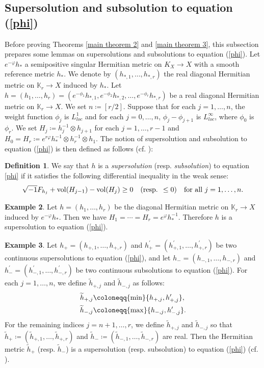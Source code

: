 \documentclass[12pt]{article}
\theoremstyle{definition}
\newtheorem{defi}{Definition}%
\newtheorem{ex}[defi]{Example}
\def\refe{\ast}
\def\vol{{\rm vol}}
\def\max{{\rm max}}
\def\min{{\rm min}}
\def\K{{\mathbb K}}
\def\inum{{\sqrt{-1}}}
\begin{document}
\subsection{Supersolution and subsolution to equation (\ref{phi})}
Before proving Theorems \ref{main theorem 2} and \ref{main theorem 3}, this subsection prepares some lemmas on supersolutions and subsolutions to equation (\ref{phi}). Let $e^{-\varphi}h_\refe$ a semipositive singular Hermitian metric on $K_X\rightarrow X$ with a smooth reference metric $h_\refe$. We denote by $(h_{\refe,1},\dots, h_{\refe,r})$ the real diagonal Hermitian metric on $\K_r\rightarrow X$ induced by $h_\refe$. Let $h = (h_1, \dots, h_r)=(e^{-\phi_1}h_{\refe,1}, e^{-\phi_2}h_{\refe,2}, \dots, e^{-\phi_r}h_{\refe,r})$ be a real diagonal Hermitian metric on $\K_r \rightarrow X$. We set $n\coloneqq [r/2]$. Suppose that for each $j=1,\dots,n$, the weight function $\phi_j$ is $L^1_{loc}$ and for each $j=0,\dots, n$, $\phi_j-\phi_{j+1}$ is $L^\infty_{loc}$, where $\phi_0$ is $\phi_r$. We set $H_j\coloneqq h_j^{-1}\otimes h_{j+1}$ for each $j=1,\dots, r-1$ and $H_0=H_r\coloneqq e^{r\varphi}h_\refe^{-1}\otimes h_r^{-1}\otimes h_1$. The notion of supersolution and subsolution to equation (\ref{phi}) is then defined as follows (cf. \cite[Definition 5.1]{LM1}):
\begin{defi} We say that $h$ is a {\it supersolution} (resp. {\it subsolution}) to equation \eqref{phi} if it satisfies the following differential inequality in the weak sense:
\begin{align*}
\inum F_{h_j} + \vol(H_{j-1}) - \vol(H_j) \geq 0 \quad (\text{resp. } \leq 0) \quad \text{for all } j = 1, \dots, n.
\end{align*}
\end{defi}
\begin{ex} Let $h=(h_1,\dots, h_r)$ be the diagonal Hermitian metric on $\K_r\rightarrow X$ induced by $e^{-\varphi}h_\refe$. Then we have $H_1=\cdots= H_r=e^{\varphi}h_\refe^{-1}$. Therefore $h$ is a supersolution to equation (\ref{phi}).
\end{ex}
\begin{ex} Let $h_+=(h_{+,1},\dots, h_{+,r})$ and $h_+^\prime=(h_{+,1}^\prime, \dots, h_{+,r}^\prime)$ be two continuous supersolutions to equation (\ref{phi}), and let $h_-=(h_{-,1},\dots, h_{-,r})$ and $h_-^\prime=(h_{-,1}^\prime, \dots, h_{-,r}^\prime)$ be two continuous subsolutions to equation (\ref{phi}). For each $j=1,\dots, n$, we define $\widetilde{h}_{+,j}$ and $\widetilde{h}_{-,j}$ as follows:
\begin{align*} 
\widetilde{h}_{+,j}&\coloneqq \min\{h_{+,j}, h_{+,j}^\prime\}, \\
\widetilde{h}_{-,j}&\coloneqq \max\{h_{-,j}, h_{-,j}^\prime\}. 
\end{align*}
For the remaining indices $j=n+1,\dots, r$, we define $\widetilde{h}_{+,j}$ and $\widetilde{h}_{-,j}$ so that $\widetilde{h}_{+}\coloneqq (\widetilde{h}_{+,1},\dots, \widetilde{h}_{+,r})$ and $\widetilde{h}_{-}\coloneqq (\widetilde{h}_{-,1},\dots, \widetilde{h}_{-,r})$ are real. Then the Hermitian metric $\widetilde{h}_+$ (resp. $\widetilde{h}_-$) is a supersolution (resp. subsolution) to equation (\ref{phi}) (cf. \cite[Lemma 5.4]{LM1}).
\end{ex}
\end{document}
